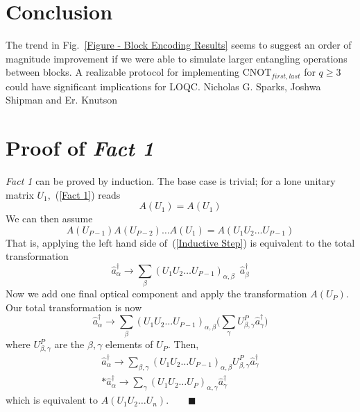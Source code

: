 \documentclass[aps,pra,twocolumn,showpacs,superscriptaddress,floatfix,10pt]{revtex4}
\begin{document}
\section{Conclusion}
\label{Section Conclusion}
 The trend in Fig.~\ref{Figure - Block Encoding Results} seems to suggest an order of magnitude improvement if we were able to simulate larger entangling operations between blocks. A realizable protocol for implementing $\mbox{CNOT}_{first,last}$ for $q \ge 3$ could have significant implications for LOQC.
\acknowledgments
Nicholas G. Sparks, Joshwa Shipman and Er. Knutson
\appendix
\section{Proof of \textit{Fact 1}}
\label{Proof of Fact 1}
\textit{Fact 1} can be proved by induction. The base case is trivial; for a lone unitary matrix $U_1$,~(\ref{Fact 1}) reads
\begin{equation}
	A(U_1) = A(U_1)
\end{equation}
We can then assume
\begin{equation}
\label{Inductive Step}
	A(U_{P-1}) A(U_{P-2}) \dots A(U_1) = A(U_1 U_2 \dots U_{P-1})
\end{equation}
That is, applying the left hand side of~(\ref{Inductive Step}) is equivalent to the total transformation
\begin{equation}
	\hat{a}^\dagger_\alpha \rightarrow \sum_\beta (U_1 U_2 \dots U_{P-1})_{\alpha,\beta} \enspace \hat{a}^\dagger_\beta
\end{equation}
Now we add one final optical component and apply the transformation $A(U_P)$. Our total transformation is now
\begin{equation}
	\hat{a}^\dagger_\alpha \rightarrow \sum_\beta (U_1 U_2 \dots U_{P-1})_{\alpha,\beta} \Big(\sum_\gamma U_{\beta,\gamma}^P \hat{a}^\dagger_\gamma \Big)
\end{equation}
where $U_{\beta,\gamma}^P$ are the $\beta,\gamma$ elements of $U_P$. Then,
\begin{eqnarray}
\hat{a}^\dagger_\alpha \rightarrow \sum_{\beta,\gamma} (U_1 U_2 \dots U_{P-1})_{\alpha,\beta} U^P_{\beta,\gamma} \hat{a}^\dagger_\gamma
\\*
\hat{a}^\dagger_\alpha \rightarrow \sum_\gamma (U_1 U_2 \dots U_P)_{\alpha,\gamma} \hat{a}^\dagger_\gamma \quad
\end{eqnarray}
which is equivalent to $A(U_1 U_2 \dots U_n). \quad \quad\blacksquare $
\end{document}

